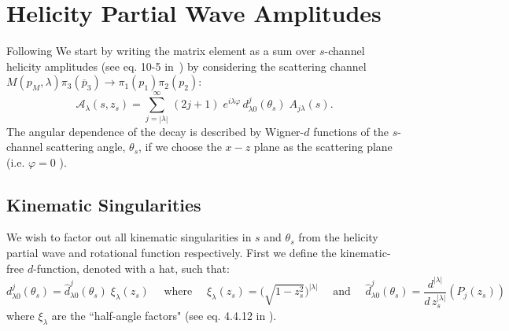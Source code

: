 \section{Helicity Partial Wave Amplitudes} \label{sec:helicity}
Following \cite{Mikhasenko:2017rkh} We start by writing the matrix element as a sum over \(s\)-channel helicity amplitudes (see eq. 10-5 in~\cite{perl}) by considering the scattering channel \(M(p_M, \lambda) \pi_3(\overline{p}_3) \to  \pi_1(p_1)\pi_2(p_2)\):
  \begin{equation}
    \label{eq:helicity}
    \mathcal{A}_\lambda(s,z_s) = \sum_{j= |\lambda|}^\infty \, (2j +1) \; e^{i\lambda\varphi} \, d_{\lambda0}^j(\theta_s) \; A_{j \lambda}(s).
  \end{equation}
The angular dependence of the decay is described by Wigner-\(d\) functions of the \(s\)-channel scattering angle, \(\theta_s\), if we choose the \(x-z\) plane as the scattering plane (i.e. \(\varphi = 0 \) ).
\subsection{Kinematic Singularities}
\label{sec:kin-singularities}
We wish to factor out all kinematic singularities in \(s\) and \(\theta_s\) from the helicity partial wave and rotational function respectively. First we define the kinematic-free \(d\)-function, denoted with a hat, such that:
  \begin{equation}
      \label{eq:halfangle}
      d^j_{\lambda 0}(\theta_s) = \hat{d}^j_{\lambda 0}(\theta_s) \; \xi_{\lambda}(z_s)
       \quad \text{ where } \quad
      \xi_{\lambda}(z_s) = \bigg( \sqrt{ 1- z_s^2} \bigg)^{|\lambda|}
       \quad \text{ and } \quad
      \hat{d}^j_{\lambda 0}(\theta_s) = \frac{d^{|\lambda|}}{d \, z_s^{|\lambda|}} (P_j(z_s))
  \end{equation}
where \(\xi_{\lambda}\) are the ``half-angle factors" (see eq. 4.4.12 in \cite{Collins}).

